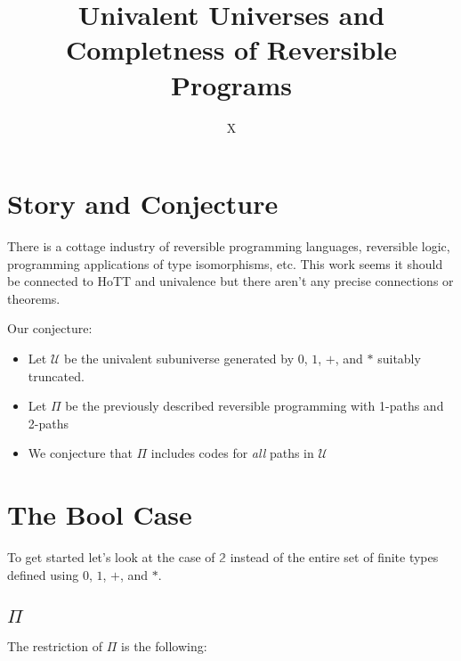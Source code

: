 \documentclass[format=acmlarge,review,natbib]{acmart}
\begin{document}
\title{Univalent Universes and Completness of Reversible Programs}

\author{X}

\begin{abstract}
\end{abstract}

\maketitle

\section{Story and Conjecture}

There is a cottage industry of reversible programming languages, reversible logic, programming applications of type isomorphisms, etc. This work seems it should be connected to HoTT and univalence but there aren't any precise connections or theorems.

Our conjecture:

\begin{itemize}
\item Let $\mathcal{U}$ be the univalent subuniverse generated by $0$, $1$, $+$,
  and $*$ suitably truncated.
\item Let $\Pi$ be the previously  described reversible programming with 1-paths and 2-paths
\item We conjecture that $\Pi$ includes codes for \emph{all} paths in $\mathcal{U}$
\end{itemize}

\section{The Bool Case}

To get started let's look at the case of $\mathbb{2}$ instead of the entire set of finite types defined using $0$, $1$, $+$, and $*$.

\subsection{$\Pi$}

The restriction of $\Pi$ is the following:
\end{document}
